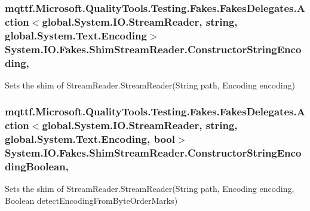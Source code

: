 \hypertarget{class_system_1_1_i_o_1_1_fakes_1_1_shim_stream_reader_a4dae3f6cacbf11c7d9989e50cef8a877}{
\subsubsection[{Constructor\-String\-Encoding}]{\setlength{\rightskip}{0pt plus 5cm}mqttf.\-Microsoft.\-Quality\-Tools.\-Testing.\-Fakes.\-Fakes\-Delegates.\-Action$<$global.\-System.\-I\-O.\-Stream\-Reader, string, global.\-System.\-Text.\-Encoding$>$ System.\-I\-O.\-Fakes.\-Shim\-Stream\-Reader.\-Constructor\-String\-Encoding\hspace{0.3cm}{\ttfamily [static]}, {\ttfamily [set]}}}\label{class_system_1_1_i_o_1_1_fakes_1_1_shim_stream_reader_a4dae3f6cacbf11c7d9989e50cef8a877}


Sets the shim of Stream\-Reader.\-Stream\-Reader(\-String path, Encoding encoding)

\hypertarget{class_system_1_1_i_o_1_1_fakes_1_1_shim_stream_reader_a985c02fb6e44d5e7ae7f5c30f508eb90}{
\subsubsection[{Constructor\-String\-Encoding\-Boolean}]{\setlength{\rightskip}{0pt plus 5cm}mqttf.\-Microsoft.\-Quality\-Tools.\-Testing.\-Fakes.\-Fakes\-Delegates.\-Action$<$global.\-System.\-I\-O.\-Stream\-Reader, string, global.\-System.\-Text.\-Encoding, bool$>$ System.\-I\-O.\-Fakes.\-Shim\-Stream\-Reader.\-Constructor\-String\-Encoding\-Boolean\hspace{0.3cm}{\ttfamily [static]}, {\ttfamily [set]}}}\label{class_system_1_1_i_o_1_1_fakes_1_1_shim_stream_reader_a985c02fb6e44d5e7ae7f5c30f508eb90}


Sets the shim of Stream\-Reader.\-Stream\-Reader(\-String path, Encoding encoding, Boolean detect\-Encoding\-From\-Byte\-Order\-Marks)

